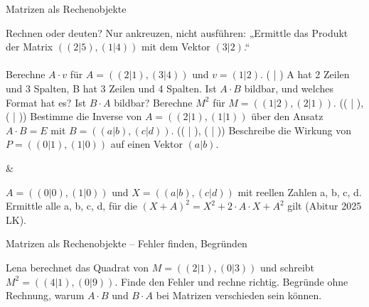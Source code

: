 \setcounter{aufgabe}{8}

\begin{aufgabe}{Matrizen als Rechenobjekte}
\begin{teile}
\teil Rechnen oder deuten? Nur ankreuzen, nicht ausführen: „Ermittle das Produkt der Matrix $((2 | 5), (1 | 4))$ mit dem Vektor $(3 | 2)$.“ \\  \\ 
\teil Berechne $A \cdot v$ für $A = ((2 | 1), (3 | 4))$ und $v = (1 | 2)$. ( \leerfeld | \leerfeld )
\teil A hat 2 Zeilen und 3 Spalten, B hat 3 Zeilen und 4 Spalten. Ist $A \cdot B$ bildbar, und welches Format hat es? Ist $B \cdot A$ bildbar?
\teil Berechne $M^2$ für $M = ((1 | 2), (2 | 1))$. (( \leerfeld | \leerfeld ), ( \leerfeld | \leerfeld ))
\teil Bestimme die Inverse von $A = ((2 | 1), (1 | 1))$ über den Ansatz $A \cdot B = E$ mit $B = ((a | b), (c | d))$. (( \leerfeld | \leerfeld ), ( \leerfeld | \leerfeld ))
\teil Beschreibe die Wirkung von $P = ((0 | 1), (1 | 0))$ auf einen Vektor $(a | b)$.
\end{teile}
\begin{gleichungsraster}[2]
 &
\end{gleichungsraster}
\begin{teile}
\teil $A = ((0 | 0), (1 | 0))$ und $X = ((a | b), (c | d))$ mit reellen Zahlen a, b, c, d. Ermittle alle a, b, c, d, für die $(X + A)^2 = X^2 + 2 \cdot A \cdot X + A^2$ gilt \hfill (Abitur 2025 LK).
\end{teile}
\end{aufgabe}

\begin{aufgabe}{Matrizen als Rechenobjekte – Fehler finden, Begründen}
\begin{teile}
\teil Lena berechnet das Quadrat von $M = ((2 | 1), (0 | 3))$ und schreibt $M^2 = ((4 | 1), (0 | 9))$. Finde den Fehler und rechne richtig.
\teil Begründe ohne Rechnung, warum $A \cdot B$ und $B \cdot A$ bei Matrizen verschieden sein können.
\end{teile}
\end{aufgabe}
